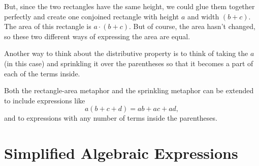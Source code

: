 But, since the two rectangles have the same height, we could glue them together perfectly and create one conjoined rectangle with height $a$ and width $(b+c)$. The area of this rectangle is $a \cdot (b+c)$. But of course, the area hasn't changed, so these two different ways of expressing the area are equal.

\begin{center}
\end{center}
Another way to think about the distributive property is to think of taking the $a$ (in this case) and sprinkling it over the parentheses so that it becomes a part of each of the terms inside.
\begin{center}
\end{center}
Both the rectangle-area metaphor and the sprinkling metaphor can be extended to include expressions like \[a(b+c+d) = ab + ac + ad,\] and to expressions with any number of terms inside the parentheses.

\section{Simplified Algebraic Expressions}
\label{sec:simpalgexpr}

